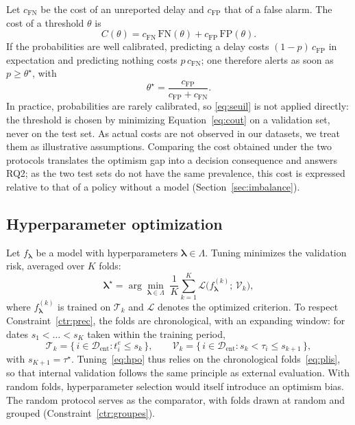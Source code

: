 \documentclass[11pt,a4paper]{article}
\theoremstyle{definition}
\begin{document}
Let $c_{\mathrm{FN}}$ be the cost of an unreported delay and $c_{\mathrm{FP}}$ that of a false alarm. The cost of a threshold $\theta$ is
\begin{equation}
  C(\theta) = c_{\mathrm{FN}}\,\mathrm{FN}(\theta) + c_{\mathrm{FP}}\,\mathrm{FP}(\theta).
  \label{eq:cout}
\end{equation}
If the probabilities are well calibrated, predicting a delay costs $(1-p)\,c_{\mathrm{FP}}$ in expectation and predicting nothing costs $p\,c_{\mathrm{FN}}$; one therefore alerts as soon as $p \ge \theta^\star$, with
\begin{equation}
  \theta^\star = \frac{c_{\mathrm{FP}}}{c_{\mathrm{FP}} + c_{\mathrm{FN}}}.
  \label{eq:seuil}
\end{equation}
In practice, probabilities are rarely calibrated, so \eqref{eq:seuil} is not applied directly: the threshold is chosen by minimizing Equation~\eqref{eq:cout} on a validation set, never on the test set. As actual costs are not observed in our datasets, we treat them as illustrative assumptions. Comparing the cost obtained under the two protocols translates the optimism gap into a decision consequence and answers RQ2; as the two test sets do not have the same prevalence, this cost is expressed relative to that of a policy without a model (Section~\ref{sec:imbalance}).

\subsection{Hyperparameter optimization}
\label{sec:hpo}

Let $f_{\boldsymbol\lambda}$ be a model with hyperparameters $\boldsymbol\lambda \in \Lambda$. Tuning minimizes the validation risk, averaged over $K$ folds:
\begin{equation}
  \boldsymbol\lambda^\star = \arg\min_{\boldsymbol\lambda \in \Lambda} \; \frac{1}{K} \sum_{k=1}^{K} \mathcal{L}\bigl(f^{(k)}_{\boldsymbol\lambda};\, \mathcal{V}_k\bigr),
  \label{eq:hpo}
\end{equation}
where $f^{(k)}_{\boldsymbol\lambda}$ is trained on $\mathcal{T}_k$ and $\mathcal{L}$ denotes the optimized criterion. To respect Constraint~\ref{ctr:prec}, the folds are chronological, with an expanding window: for dates $s_1 < \dots < s_K$ taken within the training period,
\begin{equation}
  \mathcal{T}_k = \{\, i \in \mathcal{D}_{\mathrm{ent}} : t_i^{e} \le s_k \,\}, \qquad
  \mathcal{V}_k = \{\, i \in \mathcal{D}_{\mathrm{ent}} : s_k < \tau_i \le s_{k+1} \,\},
  \label{eq:plis}
\end{equation}
with $s_{K+1} = \tau^\star$. Tuning~\eqref{eq:hpo} thus relies on the chronological folds~\eqref{eq:plis}, so that internal validation follows the same principle as external evaluation. With random folds, hyperparameter selection would itself introduce an optimism bias. The random protocol serves as the comparator, with folds drawn at random and grouped (Constraint~\ref{ctr:groupes}).
\end{document}
